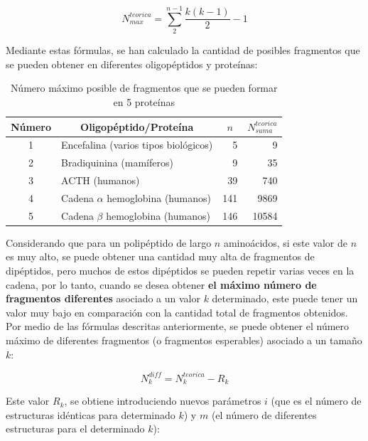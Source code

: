 \begin{equation}
N_{max}^{teorica}=\sum_{2}^{n-1} \frac{k(k-1)}{2}-1
\end{equation}

Mediante estas fórmulas, se han calculado la cantidad de posibles fragmentos que se pueden obtener en diferentes oligopéptidos y proteínas:

\begin{table}[H]
\centering
\label{my-label3}
\begin{tabular}{|c|l|r|r|}
\hline
Número & \multicolumn{1}{c|}{Oligopéptido/Proteína} & \multicolumn{1}{c|}{$n$} & \multicolumn{1}{c|}{$N_{suma}^{teorica}$} \\ \hline
1      & Encefalina (varios tipos biológicos)       & 5                        & 9                     \\
2      & Bradiquinina (mamíferos)                   & 9                        & 35                    \\
3      & ACTH (humanos)                             & 39                       & 740                   \\
4      & Cadena $\alpha$ hemoglobina (humanos)          & 141                      & 9869                  \\
5      & Cadena $\beta$ hemoglobina (humanos)          & 146                      & 10584                 \\ \hline
\end{tabular}
\caption{Número máximo posible de fragmentos que se pueden formar en 5 proteínas}
\end{table}

Considerando que para un polipéptido de largo $n$ aminoácidos, si este valor de $n$ es muy alto, se puede obtener una cantidad muy alta de fragmentos de dipéptidos, pero muchos de estos dipéptidos se pueden repetir varias veces en la cadena, por lo tanto, cuando se desea obtener {\bf{el máximo número de fragmentos diferentes}} asociado a un valor $k$ determinado, este puede tener un valor muy bajo en comparación con la cantidad total de fragmentos obtenidos. Por medio de las fórmulas descritas anteriormente, se puede obtener el número máximo de diferentes fragmentos (o fragmentos esperables) asociado a un tamaño $k$:

\begin{equation}
N_{k}^{diff}=N_{k}^{teorica}- R_{k}
\end{equation}

Este valor $R_{k}$, se obtiene introduciendo nuevos parámetros $i$ (que es el número de estructuras idénticas para determinado $k$) y $m$ (el número de diferentes estructuras para el determinado $k$):

